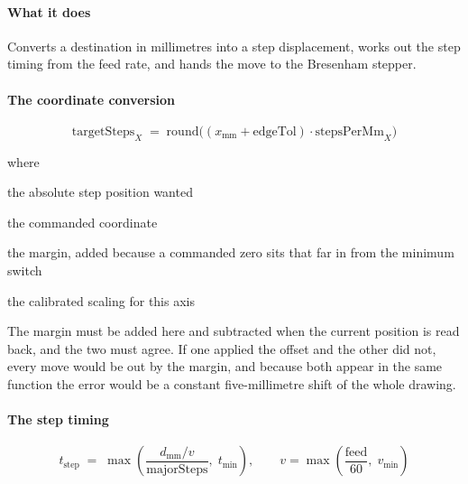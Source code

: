 \paragraph{What it does}
Converts a destination in millimetres into a step displacement, works out the step timing from the feed rate, and hands the move to the Bresenham stepper.


\paragraph{The coordinate conversion}

\begin{equation}
\mathrm{targetSteps}_X \;=\; \mathrm{round}\big( (x_{\mathrm{mm}} + \mathrm{edgeTol}) \cdot \mathrm{stepsPerMm}_X \big)
\end{equation}

\noindent where
\begin{description}[leftmargin=2.4em,style=nextline,font=\normalfont\ttfamily]\setlength\itemsep{1pt}
  \item[{$\mathrm{targetSteps}_X$}] \normalfont the absolute step position wanted
  \item[{$x_{\mathrm{mm}}$}] \normalfont the commanded coordinate
  \item[{$\mathrm{edgeTol}$}] \normalfont the margin, added because a commanded zero sits that far in from the minimum switch
  \item[{$\mathrm{stepsPerMm}_X$}] \normalfont the calibrated scaling for this axis
\end{description}
The margin must be added here and subtracted when the current position is read back, and the two must agree. If one applied the offset and the other did not, every move would be out by the margin, and because both appear in the same function the error would be a constant five-millimetre shift of the whole drawing.


\paragraph{The step timing}

\begin{equation}
t_{\mathrm{step}} \;=\; \max\!\left( \frac{d_{\mathrm{mm}} / v}{\mathrm{majorSteps}},\; t_{\min} \right), \qquad v = \max\!\left(\frac{\mathrm{feed}}{60},\; v_{\min}\right)
\end{equation}

